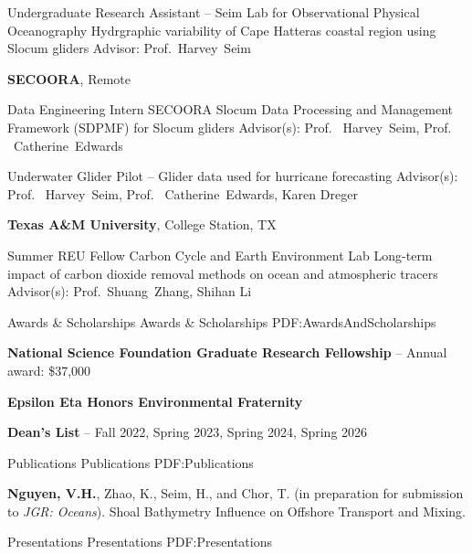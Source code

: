 \documentclass[letterpaper,MMMyyyy,nonstopmode]{simpleresumecv}
\begin{document}
\begin{Body}
\Gap
Undergraduate Research Assistant \hfill
{} --
\BulletItem
Seim Lab for Observational Physical Oceanography
\BulletItem
Hydrgraphic variability of Cape Hatteras coastal region using Slocum gliders
\BulletItem
Advisor:
Prof.~Harvey~Seim

\Gap
\Entry
\textbf{SECOORA}, Remote

\Gap
Data Engineering Intern \hfill
{}
\BulletItem
SECOORA Slocum Data Processing and Management Framework (SDPMF) for Slocum gliders
\BulletItem
Advisor(s): Prof. ~Harvey~Seim, Prof. ~Catherine~Edwards

\Gap
Underwater Glider Pilot \hfill
{} --
\BulletItem
Glider data used for hurricane forecasting
\BulletItem
Advisor(s): Prof. ~Harvey~Seim, Prof. ~Catherine~Edwards, Karen Dreger

\Gap
\Entry
{\textbf{Texas A\&M University}}, College Station, TX

\Gap
Summer REU Fellow \hfill
{}
\BulletItem
Carbon Cycle and Earth Environment Lab
\BulletItem
Long-term impact of carbon dioxide removal methods on ocean and atmospheric tracers
\BulletItem
Advisor(s):
Prof.~Shuang~Zhang, Shihan Li



\Section
{Awards \&\newline
Scholarships}
{Awards \& Scholarships}
{PDF:AwardsAndScholarships}

\textbf{National Science Foundation Graduate Research Fellowship}
\hfill
{} --
\BulletItem
Annual award: \$37,000

\Gap
\textbf{Epsilon Eta Honors Environmental Fraternity}
\hfill
{}

\Gap
\textbf{Dean's List}
\hfill
{} -- 
\BulletItem
Fall 2022, Spring 2023, Spring 2024, Spring 2026

\Section
{Publications}
{Publications}
{PDF:Publications}

\Entry
\textbf{Nguyen, V.H.}, Zhao, K., Seim, H., and Chor, T. (in preparation for submission to \textit{JGR: Oceans}). Shoal Bathymetry Influence on Offshore Transport and Mixing.


\Section
{Presentations}
{Presentations}
{PDF:Presentations}


\end{Body}
\end{document}
